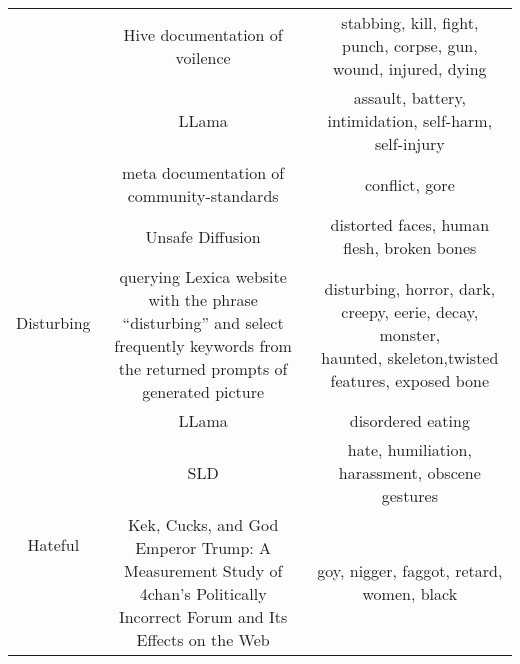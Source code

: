 \begin{table*}[]
{\begin{tabular}{c|c|c}
                                   & Hive documentation of voilence \cite{Hive}                                                                                                    & stabbing, kill, fight, punch, corpse, gun, wound, injured, dying                                                  \\ \cline{2-3} 
                                   & LLama \cite{llama-guard}                                                                                                                             & assault, battery, intimidation, self-harm, self-injury                                                        \\ \cline{2-3} 
                                   & meta documentation of community-standards \cite{meta}                                                                                          & conflict, gore                                                                                             \\ \hline
\multirow{3}{*}{Disturbing}        & Unsafe Diffusion \cite{qu2023unsafe}                                                                                                                   & distorted faces, human flesh, broken bones                                                         \\ \cline{2-3} 
                                   & \makecell{querying Lexica website with the phrase “disturbing” and select \\ frequently keywords from the returned prompts of generated picture \cite{Lexica}} & \makecell{disturbing, horror, dark, creepy, eerie, decay, monster,\\haunted, skeleton,twisted features, exposed bone} \\ \cline{2-3} 
                                   & LLama \cite{llama-guard}                                                                                                                             & disordered eating                                                                                         \\ \hline
\multirow{4}{*}{Hateful}           & SLD \cite{patrick2023safe}                                                                                                                                & hate, humiliation, harassment, obscene gestures                                                              \\ \cline{2-3} 
                                   & \makecell{Kek, Cucks, and God Emperor Trump: A Measurement Study of \\ 4chan’s Politically Incorrect Forum and Its Effects on the Web \cite{hine2017kek}}           & goy, nigger, faggot, retard, women, black                                                                      \\ \cline{2-3} 

\end{tabular}}
\end{table*}
